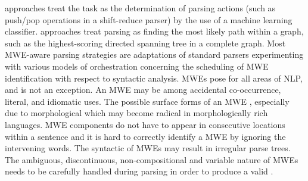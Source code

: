 \documentclass[output=paper]{LSP/langsci}
\begin{document}
\ili{}\main{}\ili{} approaches\ili{} treat\ili{} the\ili{} \ili{}\isi{}\ili{} task\ili{} as\ili{} the\ili{} determination\ili{} of\ili{} parsing\ili{} actions\ili{} \ili{}(such\ili{} as\ili{} push\ili{}/pop\ili{} operations\ili{} in\ili{} a\ili{} shift\ili{}-reduce\ili{} parser\ili{})\ili{} by\ili{} the\ili{} use\ili{} of\ili{} a\ili{} machine\ili{} learning\ili{} classifier\ili{}.\ili{} \ili{}\main{}\ili{} approaches\ili{} treat\ili{} parsing\ili{} as\ili{} finding\ili{} the\ili{} most\ili{} likely\ili{} path\ili{} within\ili{} a\ili{} graph\ili{},\ili{} such\ili{} as\ili{} the\ili{} highest\ili{}-scoring\ili{} directed\ili{} spanning\ili{} tree\ili{} in\ili{} a\ili{} complete\ili{} graph\ili{}.\ili{} Most\ili{} MWE\ili{}-aware\ili{} parsing\ili{} strategies\ili{} are\ili{} adaptations\ili{} of\ili{} standard\ili{} parsers\ili{} experimenting\ili{} with\ili{} various\ili{} models\ili{} of\ili{} orchestration\ili{} concerning\ili{} the\ili{} scheduling\ili{} of\ili{} MWE\ili{} identification\ili{} with\ili{} respect\ili{} to\ili{} syntactic\ili{} analysis\ili{}.\ili{}
\ili{}
MWEs\ili{} pose\ili{} \ili{}\main{}\ili{} for\ili{} all\ili{} areas\ili{} of\ili{} NLP\ili{},\ili{} and\ili{} \ili{}\isi{}\ili{} is\ili{} not\ili{} an\ili{} exception\ili{}.\ili{}
An\ili{} MWE\ili{} may\ili{} be\ili{} \ili{}\main{}\ili{} among\ili{} accidental\ili{} co\ili{}-occurrence\ili{},\ili{} literal\ili{},\ili{} and\ili{} idiomatic\ili{} uses\ili{}.\ili{} The\ili{} possible\ili{} surface\ili{} forms\ili{} of\ili{} an\ili{} MWE\ili{} \ili{}\main{}\ili{},\ili{} especially\ili{} due\ili{} to\ili{} morphological\ili{} \ili{}\isi{}\ili{} which\ili{} may\ili{} become\ili{} radical\ili{} in\ili{} morphologically\ili{} rich\ili{} languages\ili{}.\ili{} MWE\ili{} components\ili{} do\ili{} not\ili{} have\ili{} to\ili{} appear\ili{} in\ili{} consecutive\ili{} locations\ili{} within\ili{} a\ili{} sentence\ili{} and\ili{} it\ili{} is\ili{} hard\ili{} to\ili{} correctly\ili{} identify\ili{} a\ili{} \ili{}\main{}\ili{} MWE\ili{} by\ili{} ignoring\ili{} the\ili{} intervening\ili{} words\ili{}.\ili{} \ili{}
The\ili{} syntactic\ili{} \ili{}\main{}\ili{} of\ili{} MWEs\ili{} may\ili{} result\ili{} in\ili{} irregular\ili{} parse\ili{} trees\ili{}.\ili{}
The\ili{} ambiguous\ili{},\ili{} discontinuous\ili{},\ili{} non\ili{}-compositional\ili{} and\ili{} variable\ili{} nature\ili{} of\ili{} MWEs\ili{} needs\ili{} to\ili{} be\ili{} carefully\ili{} handled\ili{} during\ili{} parsing\ili{} in\ili{} order\ili{} to\ili{} produce\ili{} a\ili{} valid\ili{} \ili{}\isi{}\ili{}.\ili{} \ili{}
\end{document}
